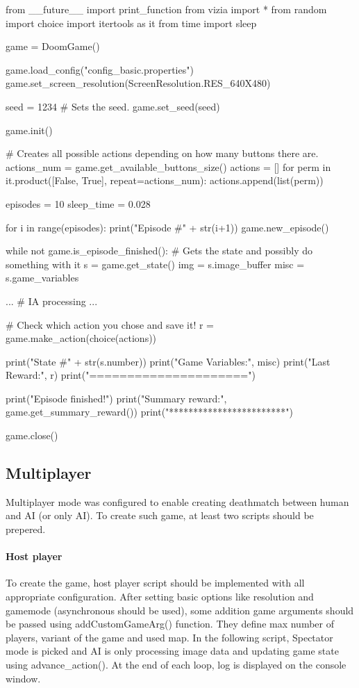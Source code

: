 \begin{pblock}
from __future__ import print_function
from vizia import *
from random import choice
import itertools as it
from time import sleep

game = DoomGame()

game.load_config("config_basic.properties")
game.set_screen_resolution(ScreenResolution.RES_640X480)

seed = 1234
# Sets the seed.
game.set_seed(seed)

game.init()

# Creates all possible actions depending on how many buttons there are.
actions_num = game.get_available_buttons_size()
actions = []
for perm in it.product([False, True], repeat=actions_num):
    actions.append(list(perm))

episodes = 10
sleep_time = 0.028

for i in range(episodes):
	print("Episode #" + str(i+1))
	game.new_episode()

	while not game.is_episode_finished():
		# Gets the state and possibly do something with it
		s = game.get_state()
		img = s.image_buffer
		misc = s.game_variables

		...
		# IA processing
		...		
		
		# Check which action you chose and save it!
		r = game.make_action(choice(actions))
		
		
		print("State #" + str(s.number))
		print("Game Variables:", misc)
		print("Last Reward:", r)
		print("=====================")

	print("Episode finished!")
	print("Summary reward:", game.get_summary_reward())
	print("************************")


game.close()
\end{pblock}

\subsection {Multiplayer}
Multiplayer mode was configured to enable creating deathmatch between human and AI (or only AI). To create such game, at least two scripts should be prepered.

\paragraph{Host player}
To create the game, host player script should be implemented with all appropriate configuration. After setting basic options like resolution and gamemode (asynchronous should be used), some addition game arguments should be passed using addCustomGameArg() function. They define max number of players, variant of the game and used map. In the following script, Spectator mode is picked and AI is only processing image data and updating game state using advance\_action(). At the end of each loop, log is displayed on the console window.

